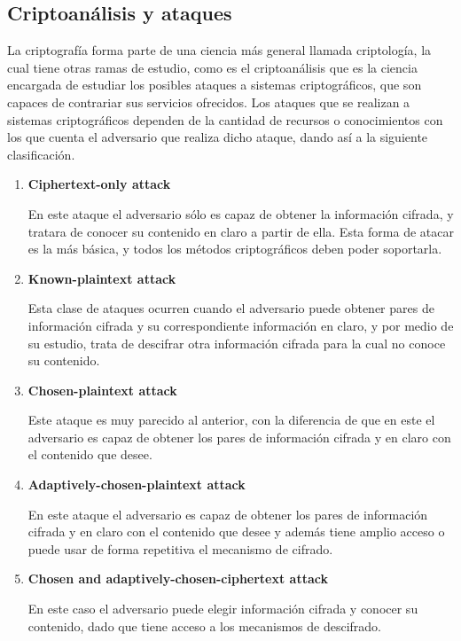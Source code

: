 
\subsection{Criptoanálisis y ataques}

  La criptografía forma parte de una ciencia más general llamada
  criptología, la cual tiene otras ramas de estudio, como es el
  criptoanálisis que es la ciencia encargada de estudiar los posibles
  ataques a sistemas criptográficos, que son capaces de contrariar sus
  servicios ofrecidos.
  Los ataques que se realizan a sistemas criptográficos dependen de la
  cantidad de recursos o conocimientos con los que cuenta el adversario
  que realiza dicho ataque, dando así a la siguiente clasificación.

  \begin{enumerate}

    \item \textbf{Ciphertext-only attack}

      En este ataque el adversario sólo es capaz de obtener la información
      cifrada, y tratara de conocer su contenido en claro a partir de ella.
      Esta forma de atacar es la más básica, y todos los métodos
      criptográficos deben poder soportarla.

    \item \textbf{Known-plaintext attack}

      Esta clase de ataques ocurren cuando el adversario puede obtener pares
      de información cifrada y su correspondiente información en claro, y
      por medio de su estudio, trata de descifrar otra información cifrada
      para la cual no conoce su contenido.

    \item \textbf{Chosen-plaintext attack}

      Este ataque es muy parecido al anterior, con la diferencia de que en
      este el adversario es capaz de obtener los pares de información
      cifrada y en claro con el contenido que desee.

    \item \textbf{Adaptively-chosen-plaintext attack}

      En este ataque el adversario es capaz de obtener los pares de
      información cifrada y en claro con el contenido que desee y además
      tiene amplio acceso o puede usar de forma repetitiva el mecanismo de
      cifrado.

    \item \textbf{Chosen and adaptively-chosen-ciphertext attack}

      En este caso el adversario puede elegir información cifrada y conocer
      su contenido, dado que tiene acceso a los mecanismos de descifrado.

  \end{enumerate}
